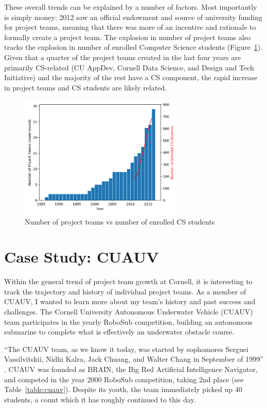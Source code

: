 \documentclass[12pt]{article}
\begin{document}
These overall trends can be explained by a number of factors.
Most importantly is simply money: 2012 saw an official endowment and source of university funding for project teams, meaning that there was more of an incentive and rationale to formally create a project team.
The explosion in number of project teams also tracks the explosion in number of enrolled Computer Science students (Figure~\ref{fig:teamcount}).
Given that a quarter of the project teams created in the last four years are primarily CS-related (CU AppDev, Cornell Data Science, and Design and Tech Initiative) and the majority of the rest have a CS component, the rapid increase in project teams and CS students are likely related.

\begin{figure}
  \center
  \includegraphics[width=0.7\textwidth]{teams-vs-cs}
  \caption{Number of project teams vs number of enrolled CS students~\cite{snabes_computer_2016}}
  \label{fig:teamcount}
\end{figure}


\section{Case Study: CUAUV}
\label{sec:cuauv}

Within the general trend of project team growth at Cornell, it is interesting to track the trajectory and history of individual project teams.
As a member of CUAUV, I wanted to learn more about my team's history and past success and challenges. The Cornell University Autonomous Underwater Vehicle (CUAUV) team participates in the yearly RoboSub competition, building an autonomous submarine to complete what is effectively an underwater obstacle course.


``The CUAUV team, as we know it today, was started by sophomores Serguei Vassilvitskii, Nidhi Kalra, Jack Chuang, and Walter Chang in September of 1999''
\cite{noauthor_cuauv_2003}. CUAUV was founded as BRAIN, the Big Red Artificial Intelligence Navigator, and competed in the year 2000 RoboSub competition, taking 2nd place (see Table~\ref{table:cuauv}).
Despite its youth, the team immediately picked up 40 students, a count which it has roughly continued to this day.
\end{document}
